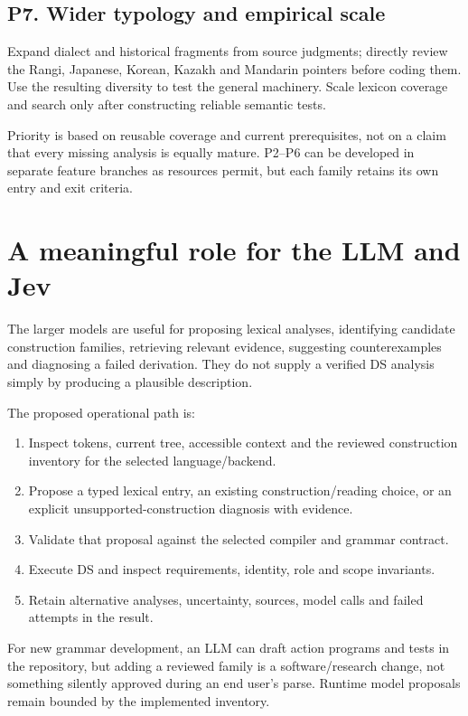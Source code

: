 \documentclass[11pt,a4paper]{article}
\providecommand{\tightlist}{\setlength{\itemsep}{2pt}\setlength{\parskip}{0pt}}
\begin{document}
\subsection{P7. Wider typology and empirical
scale}\label{p7.-wider-typology-and-empirical-scale}

Expand dialect and historical fragments from source judgments; directly
review the Rangi, Japanese, Korean, Kazakh and Mandarin pointers before
coding them. Use the resulting diversity to test the general machinery.
Scale lexicon coverage and search only after constructing reliable
semantic tests.

Priority is based on reusable coverage and current prerequisites, not on
a claim that every missing analysis is equally mature. P2--P6 can be
developed in separate feature branches as resources permit, but each
family retains its own entry and exit criteria.

\section{A meaningful role for the LLM and
Jev}\label{a-meaningful-role-for-the-llm-and-jev}

The larger models are useful for proposing lexical analyses, identifying
candidate construction families, retrieving relevant evidence,
suggesting counterexamples and diagnosing a failed derivation. They do
not supply a verified DS analysis simply by producing a plausible
description.

The proposed operational path is:

\begin{enumerate}
\def\labelenumi{\arabic{enumi}.}
\tightlist
\item
  Inspect tokens, current tree, accessible context and the reviewed
  construction inventory for the selected language/backend.
\item
  Propose a typed lexical entry, an existing construction/reading
  choice, or an explicit unsupported-construction diagnosis with
  evidence.
\item
  Validate that proposal against the selected compiler and grammar
  contract.
\item
  Execute DS and inspect requirements, identity, role and scope
  invariants.
\item
  Retain alternative analyses, uncertainty, sources, model calls and
  failed attempts in the result.
\end{enumerate}

For new grammar development, an LLM can draft action programs and tests
in the repository, but adding a reviewed family is a software/research
change, not something silently approved during an end user's parse.
Runtime model proposals remain bounded by the implemented inventory.
\end{document}
